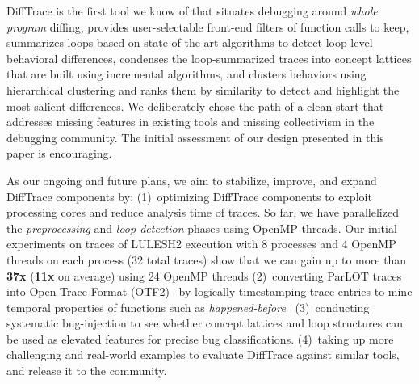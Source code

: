 DiffTrace is the first tool we know of that situates debugging around {\em whole program}
diffing, provides user-selectable front-end filters of function calls to keep,
summarizes loops based on state-of-the-art algorithms to detect loop-level
behavioral differences,
condenses the loop-summarized
traces into concept lattices that are built using incremental
algorithms, and clusters behaviors using hierarchical clustering and ranks them by similarity to detect and highlight the most salient differences.
We deliberately chose the path of a clean start that addresses missing features
in existing tools and missing collectivism in the debugging community.
%
The initial assessment of our design presented in this paper is encouraging.
%

As our ongoing and future plans, we aim to stabilize, improve, and expand DiffTrace components by: 
%
(1)~optimizing DiffTrace components to exploit processing cores and reduce analysis time of traces. 
%
So far, we have parallelized the \textit{preprocessing} and \textit{loop detection} phases using OpenMP threads. 
%
Our initial experiments on traces of LULESH2 execution with 8 processes and 4 OpenMP threads on each process (32 total traces) show that we can gain up to more than \textbf{37x} (\textbf{11x} on average) using 24 OpenMP threads
%
(2)~converting ParLOT traces into Open Trace Format (OTF2)~\cite{otf2} by logically timestamping trace entries to mine temporal properties of functions such as \textit{happened-before}~\cite{lamport}
%
(3)~conducting systematic bug-injection to see whether concept lattices and loop structures can be used as elevated features for precise bug classifications.
%
(4)~taking up more challenging and real-world examples to evaluate DiffTrace against similar tools, and release it to the community.

